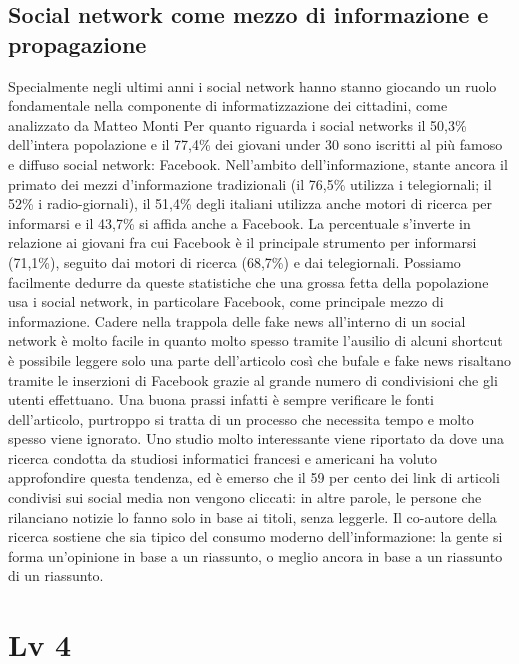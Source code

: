 \documentclass{article}
\begin{document}
\subsection{Social network come mezzo di informazione e propagazione}
Specialmente negli ultimi anni i social network hanno stanno giocando un ruolo fondamentale nella componente di informatizzazione dei cittadini, come analizzato da Matteo Monti \cite{monti2017fake} Per quanto riguarda i social networks il 50,3\% dell’intera popolazione e il 77,4\% dei giovani
under 30 sono iscritti al più famoso e diffuso social network: Facebook. Nell’ambito dell’informazione, stante ancora il primato dei mezzi d’informazione tradizionali (il 76,5\% utilizza i telegiornali;
il 52\% i radio-giornali), il 51,4\% degli italiani utilizza anche motori di ricerca per informarsi e il 43,7\%
si affida anche a Facebook. La percentuale s’inverte in relazione ai giovani fra cui Facebook è il
principale strumento per informarsi (71,1\%), seguito dai motori di ricerca (68,7\%) e dai telegiornali.
Possiamo facilmente dedurre da queste statistiche che una grossa fetta della popolazione usa i social network, in particolare Facebook, come principale mezzo di informazione.
Cadere nella trappola delle fake news all'interno di un social network è molto facile in quanto molto spesso tramite l'ausilio di alcuni shortcut è possibile leggere solo una parte dell'articolo così che bufale e fake news risaltano tramite le inserzioni di Facebook grazie al grande numero di condivisioni che gli utenti effettuano. Una buona prassi infatti è sempre verificare le fonti dell'articolo, purtroppo si tratta di un processo che necessita tempo e molto spesso viene ignorato.
Uno studio molto interessante viene riportato da \cite{titles} dove una ricerca condotta da studiosi informatici francesi e americani ha voluto approfondire questa tendenza, ed è emerso che il 59 per cento dei link di articoli condivisi sui social media non vengono cliccati: in altre parole, le persone che rilanciano notizie lo fanno solo in base ai titoli, senza leggerle. Il co-autore della ricerca sostiene che sia tipico del consumo moderno dell’informazione: la gente si forma un’opinione in base a un riassunto, o meglio ancora in base a un riassunto di un riassunto.


\section{Lv 4}
\end{document}
